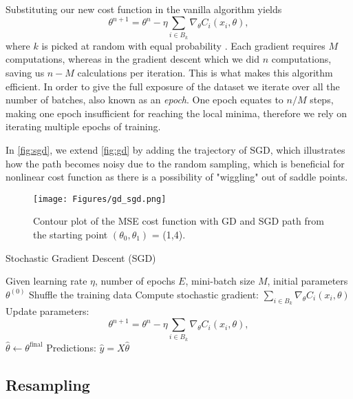 \documentclass[amssymb,twocolumn,aps]{revtex4}
\begin{document}
Substituting our new cost function in the vanilla algorithm yields $$\theta^{n+1} = \theta^n - \eta\sum_{i\in B_k} \nabla_\theta C_i (x_i,\theta),$$
where $k$ is picked at random with equal probability \cite{fysml5}. Each gradient requires $M$ computations, whereas in the gradient descent which we did $n$ computations, saving us $n - M$ calculations per iteration. This is what makes this algorithm efficient. In order to give the full exposure of the dataset we iterate over all the number of batches, also known as an \textit{epoch}. One epoch equates to $n/M$ steps, making one epoch insufficient for reaching the local minima, therefore we rely on iterating multiple epochs of training.

In \autoref{fig:sgd}, we extend \autoref{fig:gd} by adding the trajectory of SGD, which illustrates how the path becomes noisy due to the random sampling, which is beneficial for nonlinear cost function as there is a possibility of "wiggling" out of saddle points.

\begin{figure}[h]
    \centering
    \texttt{[image: Figures/gd\_sgd.png]}
    \caption{Contour plot of the MSE cost function with GD and SGD path from the starting point $(\theta_0, \theta_1)$ = (1,4).}
    \label{fig:sgd}
\end{figure}



\begin{algorithm}[H]
    \caption{Stochastic Gradient Descent (SGD)}
    \label{algorithm:SGD}
    \begin{algorithmic}[1]
        \State Given learning rate $\eta$, number of epochs $E$, mini-batch size $M$, initial parameters $\theta^{(0)}$
        \State Shuffle the training data
         
        \State Compute stochastic gradient: $\sum_{i\in B_k} \nabla_\theta C_i (x_i,\theta)$
        \State Update parameters: $$\theta^{n+1} = \theta^n - \eta\sum_{i\in B_k} \nabla_\theta C_i (x_i,\theta),$$
        \EndFor
        \EndFor
        \State $\hat{\theta} \gets \theta^{\text{final}}$
        \State Predictions: $\hat{y} = X \hat{\theta}$
    \end{algorithmic}
\end{algorithm}



\subsection{Resampling}
\end{document}
